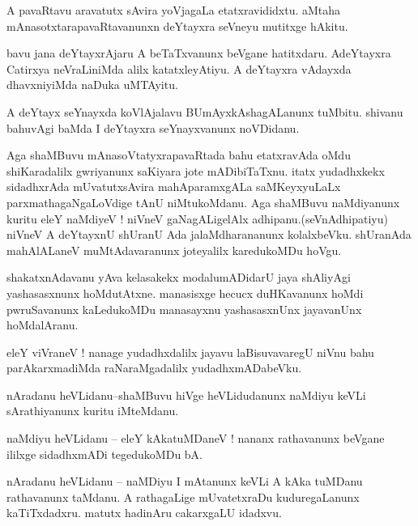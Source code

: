 \documentclass{article}
\begin{document}
\begin{mn}%
A pavaRtavu aravatutx sAvira yoVjagaLa etatxravididxtu. aMtaha mAnasotxtarapavaRtavanunxn 
deYtayxra seVneyu mutitxge hAkitu.
\end{mn}

\begin{mn}%
bavu jana deYtayxrAjaru A beTaTxvanunx beVgane hatitxdaru. AdeYtayxra Catirxya neVraLiniMda 
alilx katatxleyAtiyu. A deYtayxra vAdayxda dhavxniyiMda naDuka uMTAyitu.
\end{mn}

\begin{mn}%
A deYtayx seYnayxda koVlAjalavu BUmAyxkAshagALanunx tuMbitu. shivanu bahuvAgi baMda I 
deYtayxra seYnayxvanunx noVDidanu.
\end{mn}

\begin{mn}%
Aga shaMBuvu mAnasoVtatyxrapavaRtada bahu etatxravAda oMdu shiKaradalilx gwriyanunx saKiyara 
jote mADibiTaTxnu. itatx yudadhxkekx sidadhxrAda mUvatutxsAvira mahAparamxgALa saMKeyxyuLaLx 
parxmathagaNgaLoVdige tAnU niMtukoMdanu. Aga shaMBuvu naMdiyanunx kuritu eleY naMdiyeV ! 
niVneV gaNagALigelAlx adhipanu.(seVnAdhipatiyu) niVneV A deYtayxnU shUranU Ada 
jalaMdharananunx kolalxbeVku. shUranAda mahAlALaneV muMtAdavaranunx joteyalilx karedukoMDu 
hoVgu.
\end{mn}

\begin{mn}%
shakatxnAdavanu yAva kelasakekx modalumADidarU jaya shAliyAgi yashasasxnunx hoMdutAtxne. 
manasisxge hecucx duHKavanunx hoMdi pwruSavanunx kaLedukoMDu manasayxnu yashasasxnUnx 
jayavanUnx hoMdalAranu.
\end{mn}

\begin{mn}%
eleY viVraneV ! nanage yudadhxdalilx jayavu laBisuvavaregU niVnu bahu parAkarxmadiMda 
raNaraMgadalilx yudadhxmADabeVku.
\end{mn}

\begin{mn}%
nAradanu heVLidanu--shaMBuvu hiVge heVLidudanunx naMdiyu keVLi sArathiyanunx kuritu iMteMdanu.
\end{mn}

\begin{mn}%
naMdiyu heVLidanu -- eleY kAkatuMDaneV ! nananx rathavanunx beVgane ililxge sidadhxmADi 
tegedukoMDu bA.
\end{mn}

\begin{mn}%
nAradanu heVLidanu -- naMDiyu I mAtanunx keVLi A kAka tuMDanu rathavanunx taMdanu. A 
rathagaLige mUvatetxraDu kuduregaLanunx kaTiTxdadxru. matutx hadinAru cakarxgaLU idadxvu.
\end{mn}
\end{document}
